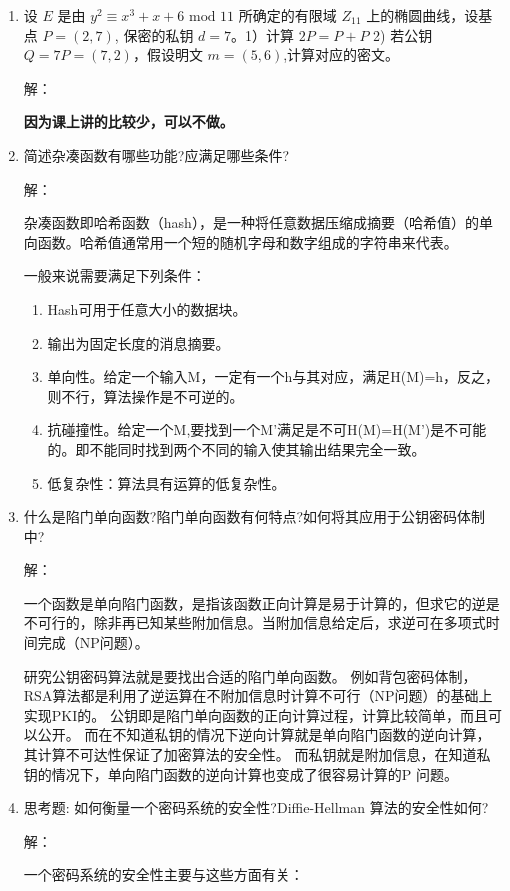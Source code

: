 \documentclass[degree=project,degree-type=project,cjk-font=noto]{thuthesis}
\begin{document}
\begin{enumerate}
\item 设 $E$ 是由 $y^2 \equiv x^3 + x + 6 \text{ mod } 11$ 所确定的有限域 $Z_{11}$ 上的椭圆曲线，设基点 $P=(2,7)$, 保密的私钥 $d = 7$。1）计算 $2P = P + P$ 2) 若公钥 $Q = 7P = (7,2)$，假设明文 $m=(5,6)$,计算对应的密文。

{\heiti 解：}

\textbf{因为课上讲的比较少，可以不做。}

\item 简述杂凑函数有哪些功能?应满足哪些条件?

{\heiti 解：}

杂凑函数即哈希函数（hash），是一种将任意数据压缩成摘要（哈希值）的单向函数。哈希值通常用一个短的随机字母和数字组成的字符串来代表。

一般来说需要满足下列条件：

\begin{enumerate}
\item Hash可用于任意大小的数据块。
\item 输出为固定长度的消息摘要。
\item 单向性。给定一个输入M，一定有一个h与其对应，满足H(M)=h，反之，则不行，算法操作是不可逆的。
\item 抗碰撞性。给定一个M,要找到一个M’满足是不可H(M)=H(M’)是不可能的。即不能同时找到两个不同的输入使其输出结果完全一致。
\item 低复杂性：算法具有运算的低复杂性。
\end{enumerate}

\item 什么是陷门单向函数?陷门单向函数有何特点?如何将其应用于公钥密码体制中?

{\heiti 解：}

一个函数是单向陷门函数，是指该函数正向计算是易于计算的，但求它的逆是不可行的，除非再已知某些附加信息。当附加信息给定后，求逆可在多项式时间完成（NP问题）。

研究公钥密码算法就是要找出合适的陷门单向函数。
例如背包密码体制，RSA算法都是利用了逆运算在不附加信息时计算不可行（NP问题）的基础上实现PKI的。
公钥即是陷门单向函数的正向计算过程，计算比较简单，而且可以公开。
而在不知道私钥的情况下逆向计算就是单向陷门函数的逆向计算，其计算不可达性保证了加密算法的安全性。
而私钥就是附加信息，在知道私钥的情况下，单向陷门函数的逆向计算也变成了很容易计算的P 问题。


\item 思考题: 如何衡量一个密码系统的安全性?Diffie-Hellman 算法的安全性如何?

{\heiti 解：}

一个密码系统的安全性主要与这些方面有关：


\end{enumerate}
\end{document}
